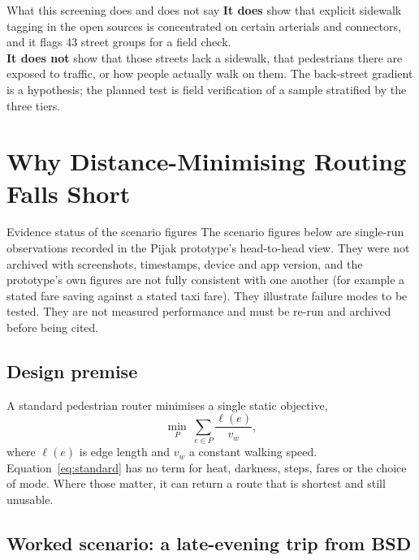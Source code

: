 \documentclass[11pt,a4paper]{article}
\begin{document}
\begin{conceptbox}{What this screening does and does not say}
\textbf{It does} show that explicit sidewalk tagging in the open sources is concentrated on certain
arterials and connectors, and it flags 43 street groups for a field check.\\[0.3em]
\textbf{It does not} show that those streets lack a sidewalk, that pedestrians there are exposed to
traffic, or how people actually walk on them. The back-street gradient is a hypothesis; the planned
test is field verification of a sample stratified by the three tiers.
\end{conceptbox}

\section{Why Distance-Minimising Routing Falls Short}\label{sec:scenarios}

\begin{evidencebox}{Evidence status of the scenario figures}
The scenario figures below are single-run observations recorded in the Pijak prototype's
head-to-head view. They were not archived with screenshots, timestamps, device and app version, and
the prototype's own figures are not fully consistent with one another (for example a stated fare
saving against a stated taxi fare). They illustrate failure modes to be tested. They are not measured
performance and must be re-run and archived before being cited.
\end{evidencebox}

\subsection{Design premise}

A standard pedestrian router minimises a single static objective,
\begin{equation}
  \min_{P}\ \sum_{e\in P}\frac{\ell(e)}{v_{w}},
  \label{eq:standard}
\end{equation}
where $\ell(e)$ is edge length and $v_w$ a constant walking speed. Equation~\eqref{eq:standard} has no
term for heat, darkness, steps, fares or the choice of mode. Where those matter, it can return a
route that is shortest and still unusable.

\subsection{Worked scenario: a late-evening trip from BSD}
\end{document}
